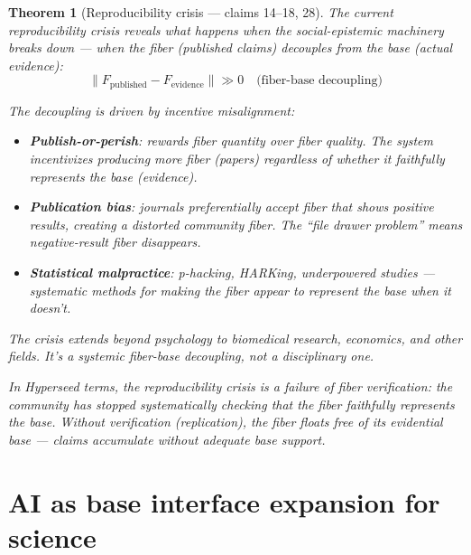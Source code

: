 \documentclass[11pt,a4paper]{article}
\newtheorem{theorem}[definition]{Theorem}
\begin{document}
\begin{theorem}[Reproducibility crisis --- claims 14--18, 28]
\label{thm:crisis}
The current reproducibility crisis reveals what happens when the
social-epistemic machinery breaks down --- when the fiber (published
claims) decouples from the base (actual evidence):
\[
  \|F_{\text{published}} - F_{\text{evidence}}\| \gg 0
  \quad \text{(fiber-base decoupling)}
\]

The decoupling is driven by incentive misalignment:
\begin{itemize}
\item \textbf{Publish-or-perish}: rewards fiber quantity over fiber
  quality. The system incentivizes producing more fiber (papers)
  regardless of whether it faithfully represents the base (evidence).
\item \textbf{Publication bias}: journals preferentially accept fiber
  that shows positive results, creating a distorted community fiber.
  The ``file drawer problem'' means negative-result fiber disappears.
\item \textbf{Statistical malpractice}: p-hacking, HARKing, underpowered
  studies --- systematic methods for making the fiber \emph{appear} to
  represent the base when it doesn't.
\end{itemize}

The crisis extends beyond psychology to biomedical research, economics,
and other fields. It's a systemic fiber-base decoupling, not a
disciplinary one.

In Hyperseed terms, the reproducibility crisis is a failure of
\emph{fiber verification}: the community has stopped systematically
checking that the fiber faithfully represents the base. Without
verification (replication), the fiber floats free of its evidential
base --- claims accumulate without adequate base support.
\end{theorem}


\section{AI as base interface expansion for science}
\label{sec:ai}
\end{document}
